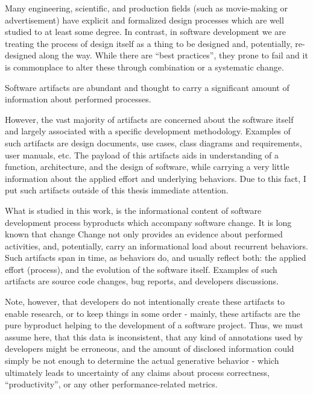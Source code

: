 \documentclass[11pt,oneside]{article}
\begin{document}
Many engineering, scientific, and production fields (such as movie-making or advertisement) have explicit 
and formalized design processes which are well studied to at least some degree. In contrast, in software 
development we are treating the process of design itself as a thing to be designed and, potentially, 
re-designed along the way. While there are ``best practices'', they prone to fail and it is commonplace
to alter these through combination or a systematic change.



Software artifacts are abundant and thought to carry a significant amount of information about performed 
processes.

However, the vast majority of artifacts are concerned about the software itself and largely associated 
with a specific development methodology. Examples of such artifacts are design documents, use cases, class 
diagrams and requirements, user manuals, etc. The payload of this artifacts aids in understanding of 
a function, architecture, and the design of software, while carrying a very little information about the 
applied effort and underlying behaviors. Due to this fact, I put such artifacts outside of this thesis
immediate attention.

What is studied in this work, is the informational content of software development process byproducts 
which accompany software change. It is long known that change Change not only provides an evidence about performed activities, and, potentially, 
carry an informational load about
recurrent behaviors. Such artifacts span in time, as behaviors do, and usually reflect both: the applied 
effort (process), and the evolution of the software itself. 
Examples of such artifacts are source code changes, bug reports, and developers discussions.

Note, however, that developers do not intentionally create these artifacts to enable research, or to keep 
things in some order - mainly, these artifacts are the pure byproduct helping to the development of a 
software project. Thus, we must assume here, that this data is inconsistent, that any kind of annotations 
used by developers might be erroneous, and the amount of disclosed information could simply be not enough
to determine the actual generative behavior - which ultimately leads to uncertainty of any claims about
process correctness, ``productivity'', or any other performance-related metrics. 
\end{document}
